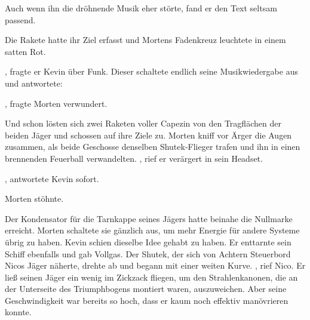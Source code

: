 \par

Auch wenn ihn die dröhnende Musik eher störte, fand er den Text seltsam passend.

\par


\par

Die Rakete hatte ihr Ziel erfasst und Mortens Fadenkreuz leuchtete in einem satten Rot.

\par

, fragte er Kevin über Funk. Dieser schaltete endlich seine Musikwiedergabe aus und antwortete: 

\par

, fragte Morten verwundert. 

\par

Und schon lösten sich zwei Raketen voller Capezin von den Tragflächen der beiden Jäger und schossen auf ihre Ziele zu. Morten kniff vor Ärger die Augen zusammen, als beide Geschosse denselben Shutek-Flieger trafen und ihn in einen brennenden Feuerball verwandelten. , rief er verärgert in sein Headset.

\par

, antwortete Kevin sofort. 

\par

Morten stöhnte. 

\par

Der Kondensator für die Tarnkappe seines Jägers hatte beinahe die Nullmarke erreicht. Morten schaltete sie gänzlich aus, um mehr Energie für andere Systeme übrig zu haben. Kevin schien dieselbe Idee gehabt zu haben. Er enttarnte sein Schiff ebenfalls und gab Vollgas. Der Shutek, der sich von Achtern Steuerbord Nicos Jäger näherte, drehte ab und begann mit einer weiten Kurve.
\ortswechsel
{}, rief Nico.  Er ließ seinen Jäger ein wenig im Zickzack fliegen, um den Strahlenkanonen, die an der Unterseite des Triumphbogens montiert waren, auszuweichen. Aber seine Geschwindigkeit war bereits so hoch, dass er kaum noch effektiv manövrieren konnte.

